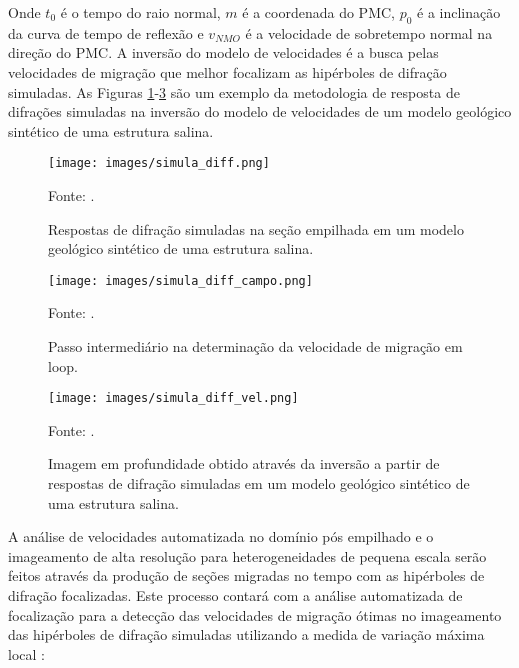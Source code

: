 Onde $t_0$ é o tempo do raio normal, $m$ é a coordenada do PMC, $p_0$ é a inclinação da curva de tempo de reflexão e $v_{NMO}$
é a velocidade de sobretempo normal na direção do PMC. A inversão do modelo de velocidades
é a busca pelas velocidades de migração que melhor focalizam as hipérboles de difração simuladas.
As Figuras \ref{fig:8.1}-\ref{fig:8.3} são um exemplo da metodologia de resposta de difrações simuladas na inversão do
modelo de velocidades de um modelo geológico sintético de uma estrutura salina.

\begin{figure}[htb]
\caption{Respostas de difração simuladas na seção empilhada em um modelo geológico sintético de uma estrutura salina.}
\begin{center}
\texttt{[image: images/simula\_diff.png]}
\vspace{-0.3cm}
\end{center}
\begin{center}
 Fonte: \cite{diffractions}.
\end{center}
\label{fig:8.1}
\end{figure}

\begin{figure}[htb]
\caption{Passo intermediário na determinação da velocidade de migração em loop.}
\begin{center}
\texttt{[image: images/simula\_diff\_campo.png]}
\vspace{-0.3cm}
\end{center}
\begin{center}
 Fonte: \cite{diffractions}.
\end{center}
\label{fig:8.2}
\end{figure}

\begin{figure}[htb]
\caption{Imagem em profundidade obtido através da inversão a partir de respostas de difração simuladas 
em um modelo geológico sintético de uma estrutura salina.}
\begin{center}
\texttt{[image: images/simula\_diff\_vel.png]}
\vspace{-0.3cm}
\end{center}
\begin{center}
 Fonte: \cite{diffractions}.
\end{center}
\label{fig:8.3}
\end{figure}

A análise de velocidades automatizada no domínio pós empilhado e o imageamento de alta resolução
para heterogeneidades de pequena escala serão feitos através da produção de seções migradas no tempo 
com as hipérboles de difração focalizadas. 
Este processo contará com a análise automatizada de focalização para a detecção das
velocidades de migração ótimas no imageamento das hipérboles de difração simuladas 
utilizando a medida de variação máxima local \cite{sep_dif}:

